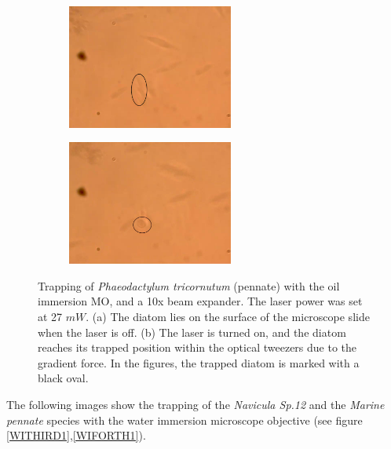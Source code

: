 \documentclass[letterpaper,12pt,oneside]{book}
\begin{document}
\begin{figure}[H]
     \centering
     \begin{subfigure}[b]{0.49\textwidth}
         \centering
         \includegraphics[width=0.6\textwidth]{Results/Resultadosalgea2/oil1.png}
         \caption{}
         \label{fig:y equals x}
     \end{subfigure}
     \hfill
     \begin{subfigure}[b]{0.49\textwidth}
         \centering
         \includegraphics[width=0.60\textwidth]{Results/Resultadosalgea2/oilt2.png}
         \caption{}
         \label{fig:three sin x}
     \end{subfigure}
     \caption{Trapping of \textit{Phaeodactylum tricornutum} (pennate) with the oil immersion MO, and a 10x beam expander. The laser power was set at 27 $mW$. (a) The diatom lies on the surface of the microscope slide when the laser is off. (b) The laser is turned on, and the diatom reaches its trapped position within the optical tweezers due to the gradient force. In the figures, the trapped diatom is
marked with a black oval.}
\label{OISECOND2}
     \hfill
\end{figure}
\noindent The following images show the trapping of the \textit{Navicula Sp.12} and the \textit{Marine pennate} species with the water immersion microscope objective (see figure \ref{WITHIRD1},\ref{WIFORTH1}).
\end{document}

